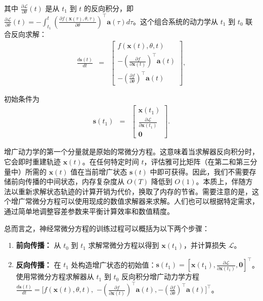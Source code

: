 \documentclass[UTF8,a4paper,zihao=-4,oneside,openany]{ctexbook}
\begin{document}
\noindent 其中 $\frac{\partial \mathcal{L}}{\partial \theta}(t)$ 是从 $t_1$ 到 $t$ 的反向积分，即 $\frac{\partial \mathcal{L}}{\partial \theta}(t) = - \int_{t_1}^{t} \left( \frac{\partial f(\mathbf{x}(\tau), \theta, \tau)}{\partial \theta} \right)^\top \mathbf{a}(\tau) d\tau$。这个组合系统的动力学从 $t_1$ 到 $t_0$ 联合反向求解：
\begin{eqnarray}
\frac{d \mathbf{s}(t)}{dt} & = & \begin{bmatrix} f(\mathbf{x}(t), \theta, t) \\ - \left( \frac{\partial f}{\partial \mathbf{x}(t)} \right)^\top \mathbf{a}(t) \\ - \left( \frac{\partial f}{\partial \theta} \right)^\top \mathbf{a}(t) \end{bmatrix},
\end{eqnarray}

\noindent 初始条件为
\begin{eqnarray}
\mathbf{s}(t_1) & = & \begin{bmatrix} \mathbf{x}(t_1) \\ \frac{\partial \mathcal{L}}{\partial \mathbf{x}(t_1)} \\ \mathbf{0} \end{bmatrix}.
\end{eqnarray}

增广动力学的第一个分量就是原始的常微分方程。这意味着当求解器反向积分时，它会即时重建轨迹 $\mathbf{x}(t)$。在任何特定时间 $t$，评估雅可比矩阵（在第二和第三分量中）所需的 $\mathbf{x}(t)$ 值在当前增广状态 $\mathbf{s}(t)$ 中即可获得。因此，我们不需要存储前向传播的中间状态，内存复杂度从 $O(T)$ 降低到 $O(1)$。本质上，伴随方法以重新求解状态轨迹的计算开销为代价，换取了内存的节省。需要注意的是，这个增广常微分方程可以使用现成的数值求解器来求解。人们也可以根据特定需求，通过简单地调整容差参数来平衡计算效率和数值精度。

总而言之，神经常微分方程的训练过程可以概括为以下两个步骤：

\begin{enumerate}
    \item \textbf{前向传播：} 从 $t_0$ 到 $t_1$ 求解常微分方程以得到 $\mathbf{x}(t_1)$，并计算损失 $\mathcal{L}$。
    \item \textbf{反向传播：} 在 $t_1$ 处构造增广状态的初始值：$\mathbf{s}(t_1) = [\mathbf{x}(t_1), \frac{\partial \mathcal{L}}{\partial \mathbf{x}(t_1)}, \mathbf{0}]^\top$。使用常微分方程求解器从 $t_1$ 到 $t_0$ 反向积分增广动力学方程 $\frac{d \mathbf{s}(t)}{dt} = [f(\mathbf{x}(t), \theta, t),$ $- \left( \frac{\partial f}{\partial \mathbf{x}(t)} \right)^\top \mathbf{a}(t), - \left( \frac{\partial f}{\partial \theta} \right)^\top \mathbf{a}(t)]^\top$。
\end{enumerate}
\end{document}
